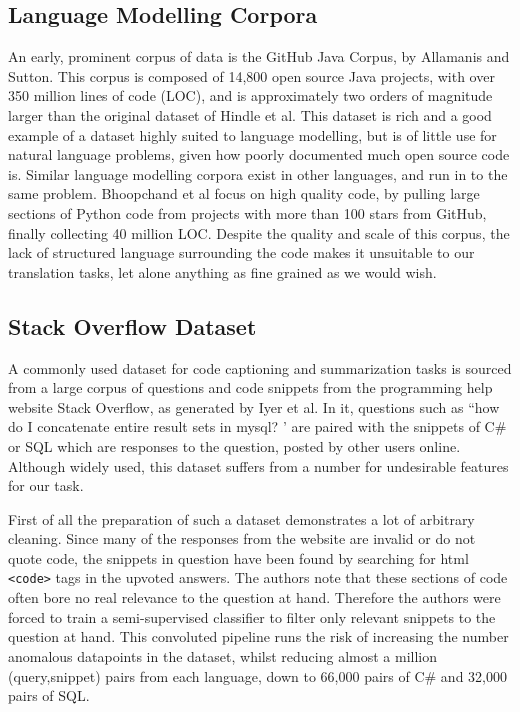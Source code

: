 \subsection{Language Modelling Corpora}
An early, prominent corpus of data is the GitHub Java Corpus, by Allamanis and Sutton\cite{allamanis_mining_2013}. This corpus is composed of 14,800 open source Java projects, with over 350 million lines of code (LOC), and is approximately two orders of magnitude larger than the original dataset of Hindle et al. This dataset is rich and a good example of a dataset highly suited to language modelling, but is of little use for natural language problems, given how poorly documented much open source code is.
Similar language modelling corpora exist in other languages, and run in to the same problem. Bhoopchand et al \cite{bhoopchand_learning_2016} focus on high quality code, by pulling large sections of Python code from projects with more than 100 stars from GitHub, finally collecting 40 million LOC. 
Despite the quality and scale of this corpus, the lack of structured language surrounding the code makes it unsuitable to our translation tasks, let alone anything as fine grained as we would wish.

\subsection{Stack Overflow Dataset}

A commonly used dataset for code captioning and summarization tasks is sourced from a large corpus of questions and code snippets from the programming help website Stack Overflow, as generated by Iyer et al\cite{iyer_summarizing_2016}. In it, questions such as ``how do I concatenate entire result sets in mysql? ' are paired with the snippets of C\# or SQL which are responses to the question, posted by other users online.
Although widely used, this dataset suffers from a number for undesirable features for our task. 

First of all the preparation of such a dataset demonstrates a lot of arbitrary cleaning.
Since many of the responses from the website are invalid or do not quote code, the snippets in question have been found by searching for html \texttt{<code>} tags in the upvoted answers. 
The authors note that these sections of code often bore no real relevance to the question at hand. Therefore the authors were forced to train a semi-supervised classifier to filter only relevant snippets to the question at hand.
This convoluted pipeline runs the risk of increasing the number anomalous datapoints in the dataset, whilst reducing almost a million (query,snippet) pairs from each language, down to 66,000 pairs  of C\# and 32,000 pairs of SQL.


